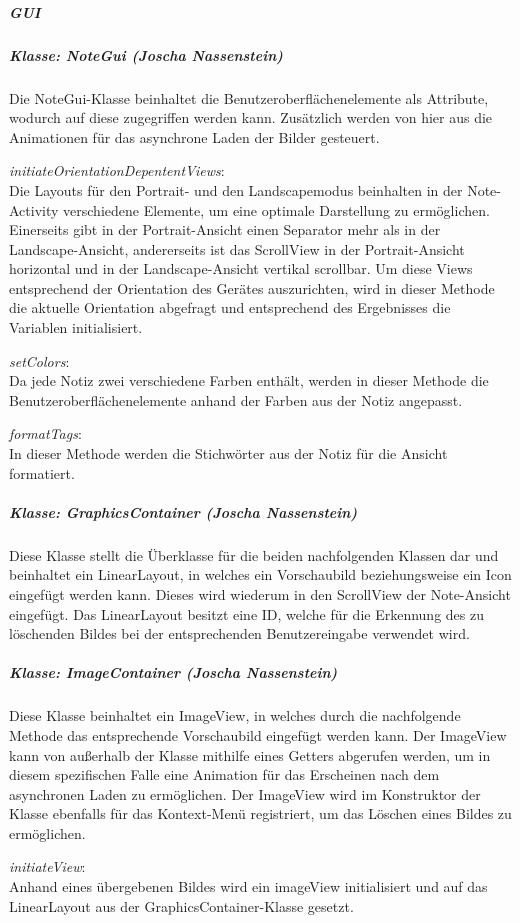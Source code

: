 \subparagraph{GUI}
\subparagraph*{Klasse: NoteGui (Joscha Nassenstein)}
Die NoteGui-Klasse beinhaltet die Benutzeroberflächenelemente als Attribute, wodurch auf diese zugegriffen werden kann. Zusätzlich werden von hier aus die Animationen für das asynchrone Laden der Bilder gesteuert.

\textit{initiateOrientationDepententViews}:\\
Die Layouts für den Portrait- und den Landscapemodus beinhalten in der Note-Activity verschiedene Elemente, um eine optimale Darstellung zu ermöglichen. Einerseits gibt in der Portrait-Ansicht einen Separator mehr als in der Landscape-Ansicht, andererseits ist das ScrollView in der Portrait-Ansicht horizontal und in der Landscape-Ansicht vertikal scrollbar. Um diese Views entsprechend der Orientation des Gerätes auszurichten, wird in dieser Methode die aktuelle Orientation abgefragt und entsprechend des Ergebnisses die Variablen initialisiert.

\textit{setColors}:\\
Da jede Notiz zwei verschiedene Farben enthält, werden in dieser Methode die Benutzeroberflächenelemente anhand der Farben aus der Notiz angepasst.

\textit{formatTags}:\\
In dieser Methode werden die Stichwörter aus der Notiz für die Ansicht formatiert.

\subparagraph*{Klasse: GraphicsContainer (Joscha Nassenstein)}
Diese Klasse stellt die Überklasse für die beiden nachfolgenden Klassen dar und beinhaltet ein LinearLayout, in welches ein Vorschaubild beziehungsweise ein Icon eingefügt werden kann. Dieses wird wiederum in den ScrollView der Note-Ansicht eingefügt. Das LinearLayout besitzt eine ID, welche für die Erkennung des zu löschenden Bildes bei der entsprechenden Benutzereingabe verwendet wird.

\subparagraph*{Klasse: ImageContainer (Joscha Nassenstein)}
Diese Klasse beinhaltet ein ImageView, in welches durch die nachfolgende Methode das entsprechende Vorschaubild eingefügt werden kann. Der ImageView kann von außerhalb der Klasse mithilfe eines Getters abgerufen werden, um in diesem spezifischen Falle eine Animation für das Erscheinen nach dem asynchronen Laden zu ermöglichen. Der ImageView wird im Konstruktor der Klasse ebenfalls für das Kontext-Menü registriert, um das Löschen eines Bildes zu ermöglichen.

\textit{initiateView}:\\
Anhand eines übergebenen Bildes wird ein imageView initialisiert und auf das LinearLayout aus der GraphicsContainer-Klasse gesetzt.

